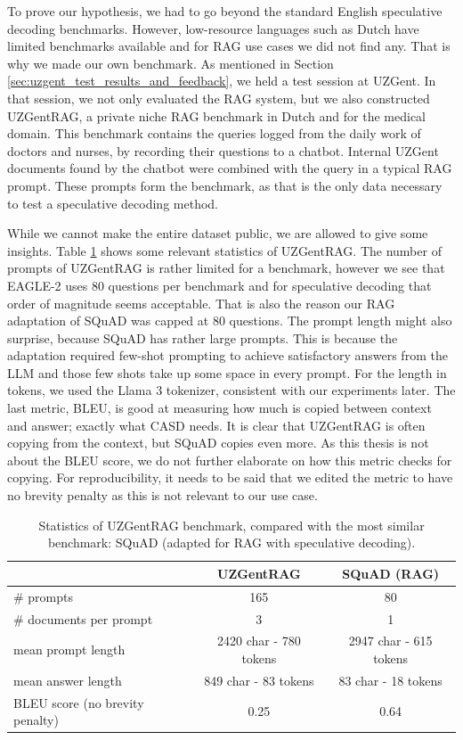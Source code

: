 To prove our hypothesis, we had to go beyond the standard English speculative decoding benchmarks. However, low-resource languages such as Dutch have limited benchmarks available and for RAG use cases we did not find any. That is why we made our own benchmark. As mentioned in Section \ref{sec:uzgent_test_results_and_feedback}, we held a test session at UZGent. In that session, we not only evaluated the RAG system, but we also constructed UZGentRAG, a private niche RAG benchmark in Dutch and for the medical domain. This benchmark contains the queries logged from the daily work of doctors and nurses, by recording their questions to a chatbot. Internal UZGent documents found by the chatbot were combined with the query in a typical RAG prompt. These prompts form the benchmark, as that is the only data necessary to test a speculative decoding method.

While we cannot make the entire dataset public, we are allowed to give some insights. Table \ref{tab:uzgentrag_benchmark} shows some relevant statistics of UZGentRAG. The number of prompts of UZGentRAG is rather limited for a benchmark, however we see that EAGLE-2 uses 80 questions per benchmark and for speculative decoding that order of magnitude seems acceptable. That is also the reason our RAG adaptation of SQuAD was capped at 80 questions. The prompt length might also surprise, because SQuAD has rather large prompts. This is because the adaptation required few-shot prompting to achieve satisfactory answers from the LLM and those few shots take up some space in every prompt. For the length in tokens, we used the Llama 3 \cite{grattafiori2024llama} tokenizer, consistent with our experiments later. The last metric, BLEU, is good at measuring how much is copied between context and answer; exactly what CASD needs. It is clear that UZGentRAG is often copying from the context, but SQuAD copies even more. As this thesis is not about the BLEU score, we do not further elaborate on how this metric checks for copying. For reproducibility, it needs to be said that we edited the metric to have no brevity penalty as this is not relevant to our use case.

\begin{table}[h]
    \centering
    \begin{tabular}{l|cc}
         & UZGentRAG & SQuAD (RAG) \\
        \hline
        \# prompts & 165 & 80 \\
        \# documents per prompt & 3 & 1 \\ 
        mean prompt length & 2420 char - 780 tokens & 2947 char - 615 tokens\\
        mean answer length & 849 char - 83 tokens & 83 char - 18 tokens\\
        BLEU score (no brevity penalty) & 0.25 & 0.64\\
    \end{tabular}
    \caption{Statistics of UZGentRAG benchmark, compared with the most similar benchmark: SQuAD (adapted for RAG with speculative decoding).}
    \label{tab:uzgentrag_benchmark}
\end{table}

